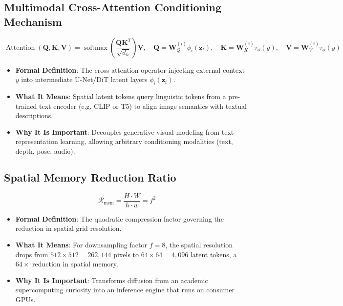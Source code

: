 \documentclass[11pt,a4paper]{article}
\theoremstyle{definition}
\begin{document}
\subsection{Multimodal Cross-Attention Conditioning Mechanism}
{\boldmath
\begin{equation}
\operatorname{Attention}(\mathbf{Q}, \mathbf{K}, \mathbf{V}) = \operatorname{softmax}\left( \frac{\mathbf{Q} \mathbf{K}^T}{\sqrt{d_k}} \right) \mathbf{V}, \quad \mathbf{Q} = \mathbf{W}_Q^{(i)} \phi_i(\mathbf{z}_t), \quad \mathbf{K} = \mathbf{W}_K^{(i)} \tau_\phi(y), \quad \mathbf{V} = \mathbf{W}_V^{(i)} \tau_\phi(y)
\end{equation}
}
\begin{itemize}
    \item \textbf{Formal Definition}: The cross-attention operator injecting external context $y$ into intermediate U-Net/DiT latent layers $\phi_i(\mathbf{z}_t)$.
    \item \textbf{What It Means}: Spatial latent tokens query linguistic tokens from a pre-trained text encoder (e.g. CLIP or T5) to align image semantics with textual descriptions.
    \item \textbf{Why It Is Important}: Decouples generative visual modeling from text representation learning, allowing arbitrary conditioning modalities (text, depth, pose, audio).
\end{itemize}

\subsection{Spatial Memory Reduction Ratio}
{\boldmath
\begin{equation}
\mathcal{R}_{\text{mem}} = \frac{H \cdot W}{h \cdot w} = f^2
\end{equation}
}
\begin{itemize}
    \item \textbf{Formal Definition}: The quadratic compression factor governing the reduction in spatial grid resolution.
    \item \textbf{What It Means}: For downsampling factor $f = 8$, the spatial resolution drops from $512 \times 512 = 262,144$ pixels to $64 \times 64 = 4,096$ latent tokens, a $64\times$ reduction in spatial memory.
    \item \textbf{Why It Is Important}: Transforms diffusion from an academic supercomputing curiosity into an inference engine that runs on consumer GPUs.
\end{itemize}
\end{document}
